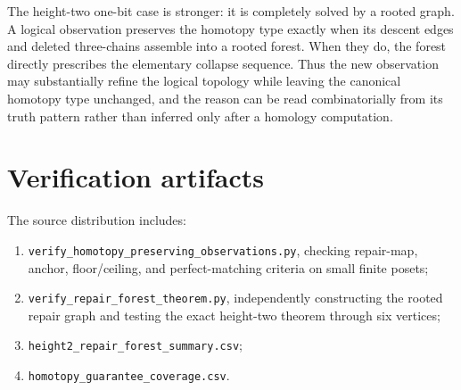 \documentclass[11pt]{article}
\theoremstyle{definition}
\begin{document}
The height-two one-bit case is stronger: it is completely solved by a rooted graph. A logical observation preserves the homotopy type exactly when its descent edges and deleted three-chains assemble into a rooted forest. When they do, the forest directly prescribes the elementary collapse sequence. Thus the new observation may substantially refine the logical topology while leaving the canonical homotopy type unchanged, and the reason can be read combinatorially from its truth pattern rather than inferred only after a homology computation.

\appendix
\section{Verification artifacts}

The source distribution includes:
\begin{enumerate}
\item \texttt{verify\_homotopy\_preserving\_observations.py}, checking repair-map, anchor, floor/ceiling, and perfect-matching criteria on small finite posets;
\item \texttt{verify\_repair\_forest\_theorem.py}, independently constructing the rooted repair graph and testing the exact height-two theorem through six vertices;
\item \texttt{height2\_repair\_forest\_summary.csv};
\item \texttt{homotopy\_guarantee\_coverage.csv}.
\end{enumerate}
\end{document}
